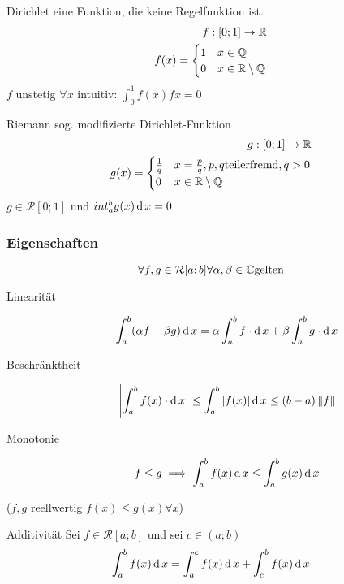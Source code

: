 \begin{Bsp}{Dirichlet}
  eine Funktion, die keine Regelfunktion ist.
  \begin{align*}
    f:[0;1]\to\mathbb{R}\\
    f(x)=\begin{cases}
      1 & x\in \mathbb{Q}\\
      0 & x\in \mathbb{R}\setminus\mathbb{Q}
    \end{cases}
  \end{align*}
  $f$ unstetig $\forall x$ intuitiv: $\int^1_0 f(x)fx =0$
\end{Bsp}
\begin{Bsp}{Riemann}
  sog. modifizierte Dirichlet-Funktion
  \begin{align*}
    g:[0;1]\to\mathbb{R}\\
    g(x)=\begin{cases}
      \frac{1}{q}  & x=\frac{p}{q}, p,q \text{teilerfremd}, q>0\\
      0 & x\in \mathbb{R}\setminus \mathbb{Q}
    \end{cases}
  \end{align*}
  $g\in \mathcal{R}[0;1]$ und $int^b_ag(x)\operatorname{d} x=0$
\end{Bsp}
\subsubsection{Eigenschaften}
\begin{Sat}
  \[\forall f, g\in \mathcal{R} [a;b] \forall \alpha,\beta\in \mathbb{C} \text{gelten}\]
  \begin{description}
    \item[Linearität] \[\int^b_a(\alpha f+ \beta g)\operatorname{d} x = \alpha \int^b_af\cdot \operatorname{d} x+\beta\int^b_a g\cdot \operatorname{d} x\]
    \item[Beschränktheit] \[\left| \int^b_a f(x)\cdot \operatorname{d} x \right|\leq \int^b_a\left| f(x) \right|\operatorname{d} x\leq (b-a)\left\| f \right\|\]
    \item[Monotonie] \[f\leq g \implies \int^b_af(x)\operatorname{d} x\leq \int^b_ag(x)\operatorname{d} x\]
  \end{description}
  ($f,g$ reellwertig $f(x)\leq g(x)\forall x$)
\end{Sat}
\begin{Sat}{Additivität}
  Sei $f\in \mathcal{R}[a;b]$ und sei $c\in (a;b)$
  \[\int^b_af(x)\operatorname{d} x=\int^c_a f(x)\operatorname{d} x+\int^b_cf(x)\operatorname{d} x\]
\end{Sat}
